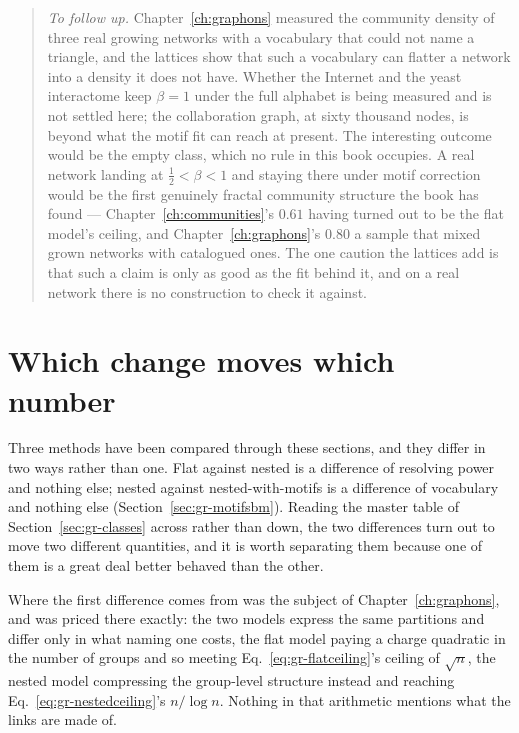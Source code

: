 \begin{quote}
\emph{To follow up.} Chapter~\ref{ch:graphons} measured the community density of
three real growing networks with a vocabulary that could not name a triangle, and
the lattices show that such a vocabulary can flatter a network into a density it
does not have. Whether the Internet and the yeast interactome keep $\beta=1$
under the full alphabet is being measured and is not settled here; the
collaboration graph, at sixty thousand nodes, is beyond what the motif fit can
reach at present. The interesting outcome would be the empty class, which no rule
in this book occupies. A real network landing at $\tfrac12<\beta<1$ and staying
there under motif correction would be the first genuinely fractal community
structure the book has found --- Chapter~\ref{ch:communities}'s $0.61$ having
turned out to be the flat model's ceiling, and Chapter~\ref{ch:graphons}'s $0.80$
a sample that mixed grown networks with catalogued ones. The one caution the
lattices add is that such a claim is only as good as the fit behind it, and on a
real network there is no construction to check it against.
\end{quote}

\section{Which change moves which number}
\label{sec:gr-doubledissoc}

Three methods have been compared through these sections, and they differ in two
ways rather than one. Flat against nested is a difference of resolving power and
nothing else; nested against nested-with-motifs is a difference of vocabulary and
nothing else (Section~\ref{sec:gr-motifsbm}). Reading the master table of
Section~\ref{sec:gr-classes} across rather than down, the two differences turn
out to move two different quantities, and it is worth separating them because
one of them is a great deal better behaved than the other.

Where the first difference comes from was the subject of
Chapter~\ref{ch:graphons}, and was priced there exactly: the two models express
the same partitions and differ only in what naming one costs, the flat model
paying a charge quadratic in the number of groups and so meeting
Eq.~\eqref{eq:gr-flatceiling}'s ceiling of $\sqrt n$, the nested model
compressing the group-level structure instead and reaching
Eq.~\eqref{eq:gr-nestedceiling}'s $n/\log n$. Nothing in that arithmetic mentions
what the links are made of.

